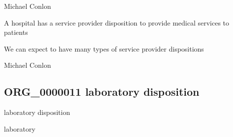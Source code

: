 \documentclass[letterpaper,10pt,english]{sphinxmanual}
\begin{document}
\begin{sphinxShadowBox}

\sphinxAtStartPar
Michael Conlon 
\end{sphinxShadowBox}

\begin{sphinxShadowBox}

\sphinxAtStartPar
A hospital has a service provider disposition to provide medical services to patients
\end{sphinxShadowBox}

\begin{sphinxShadowBox}

\sphinxAtStartPar
We can expect to have many types of service provider dispositions
\end{sphinxShadowBox}

\begin{sphinxShadowBox}

\sphinxAtStartPar
Michael Conlon 
\end{sphinxShadowBox}
\begin{quote}

\ignorespaces \end{quote}


\subsection{ORG\_0000011 \sphinxhyphen{} laboratory disposition}
\label{\detokenize{doc-ORG_0000011:org-0000011-laboratory-disposition}}\label{\detokenize{doc-ORG_0000011:index-0}}\label{\detokenize{doc-ORG_0000011::doc}}
\begin{sphinxShadowBox}

\sphinxAtStartPar
laboratory disposition
\end{sphinxShadowBox}

\begin{sphinxShadowBox}

\sphinxAtStartPar
laboratory
\end{sphinxShadowBox}
\end{document}

